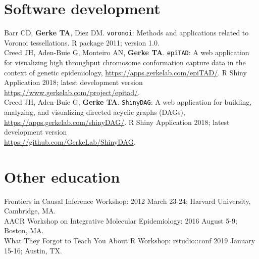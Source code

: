 \documentclass[11pt, a4paper]{article} %
\begin{document}
\section*{Software development}
Barr CD, {\bf Gerke TA}, Diez DM. \verb|voronoi|: Methods and applications related to Voronoi tessellations. R package 2011; version 1.0.\\

Creed JH, Aden-Buie G, Monteiro AN, {\bf Gerke TA}. \verb|epiTAD|: A web application for visualizing high throughput chromosome conformation capture data in the context of genetic epidemiology, \href{https://apps.gerkelab.com/epiTAD/}{https://apps.gerkelab.com/epiTAD/}. R Shiny Application 2018; latest development version \href{https://www.gerkelab.com/project/epitad/}{https://www.gerkelab.com/project/epitad/}.\\

Creed JH, Aden-Buie G, {\bf Gerke TA}. \verb|ShinyDAG|: A web application for building, analyzing, and visualizing directed acyclic graphs (DAGs), \href{https://apps.gerkelab.com/shinyDAG/}{https://apps.gerkelab.com/shinyDAG/}. R Shiny Application 2018; latest development version \\\href{https://github.com/GerkeLab/ShinyDAG}{https://github.com/GerkeLab/ShinyDAG}.

\section*{Other education}
Frontiers in Causal Inference Workshop: 2012 March 23-24; Harvard University, Cambridge, MA.\\

AACR Workshop on Integrative Molecular Epidemiology: 2016 August 5-9; Boston, MA.\\

What They Forgot to Teach You About R Workshop: rstudio::conf 2019 January 15-16; Austin, TX.


\end{document}
